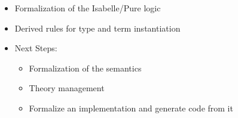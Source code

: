 \begin{frame}
  \begin{itemize}[<+->]
    \item Formalization of the Isabelle/Pure logic
    \item Derived rules for type and term instantiation
  	\item Next Steps:
  	\begin{itemize}
          \item Formalization of the semantics
          \item Theory management
          \item Formalize an implementation and generate code from it
      \end{itemize}
  \end{itemize}
\end{frame}

